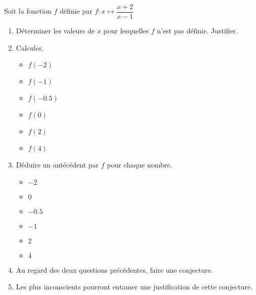 \begin{exercice}
    Soit la fonction $f$ définie par $f:x\longmapsto\dfrac{x+2}{x-1}$
    \begin{enumerate}
        \item Déterminer les valeurs de $x$ pour lesquelles $f$ n'est pas définie. Justifier.
        \item Calculer.
        \vspace*{-3mm}
        \begin{multicols}{3}
            \begin{itemize}
                \item $f(-2)$
                \item $f(-1)$
                \item $f(\num{-0.5})$
                \item $f(0)$
                \item $f(2)$
                \item $f(4)$
            \end{itemize}               
        \end{multicols}
        \item Déduire un antécédent par $f$ pour chaque nombre.
        \vspace*{-3mm}
        \begin{multicols}{3}
            \begin{itemize}
                \item $-2$
                \item $0$
                \item $\num{-0.5}$
                \item $-1$                
                \item $2$
                \item $4$
            \end{itemize}               
        \end{multicols}
        \item Au regard des deux questions précédentes, faire une conjecture.
        \item Les plus inconscients pourront entamer une justification de cette conjecture.
    \end{enumerate}    
\end{exercice}
